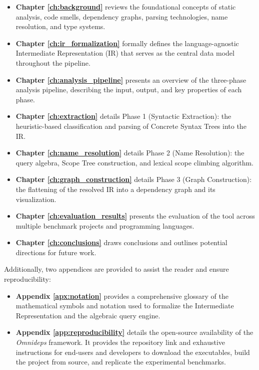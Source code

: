 \begin{itemize}
  \item \textbf{Chapter \ref{ch:background}} reviews the foundational concepts
    of static analysis, code smells, dependency graphs, parsing
    technologies, name resolution, and type systems.
  \item \textbf{Chapter \ref{ch:ir_formalization}} formally defines the
    language-agnostic Intermediate Representation (IR) that serves as the
    central data model throughout the pipeline.
  \item \textbf{Chapter \ref{ch:analysis_pipeline}} presents an overview of
    the three-phase analysis pipeline, describing the input, output, and
    key properties of each phase.
  \item \textbf{Chapter \ref{ch:extraction}} details Phase 1 (Syntactic
    Extraction): the heuristic-based classification and parsing of
    Concrete Syntax Trees into the IR.
  \item \textbf{Chapter \ref{ch:name_resolution}} details Phase 2 (Name
    Resolution): the query algebra, Scope Tree construction, and lexical
    scope climbing algorithm.
  \item \textbf{Chapter \ref{ch:graph_construction}} details Phase 3 (Graph
    Construction): the flattening of the resolved IR into a dependency
    graph and its visualization.
  \item \textbf{Chapter \ref{ch:evaluation_results}} presents the
    evaluation of the
    tool across multiple benchmark projects and programming languages.
  \item \textbf{Chapter \ref{ch:conclusions}} draws conclusions and outlines
    potential directions for future work.
\end{itemize}

Additionally, two appendices are provided to assist the reader and
ensure reproducibility:
\begin{itemize}
  \item \textbf{Appendix \ref{apx:notation}} provides a comprehensive
    glossary of the mathematical symbols and notation used to
    formalize the Intermediate Representation and the algebraic query engine.
  \item \textbf{Appendix \ref{app:reproducibility}} details the
    open-source availability of the \textit{Omnideps} framework. It
    provides the repository link and exhaustive instructions for
    end-users and developers to download the executables, build the
    project from source, and replicate the experimental benchmarks.
\end{itemize}
